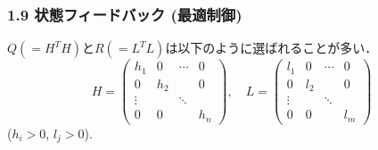 \documentclass[10pt]{beamer}
\begin{document}
\begin{frame}[t]
\frametitle{1.9 状態フィードバック (最適制御)}
$Q(=H^T H)$と$R(=L^T L)$は以下のように選ばれることが多い．
\begin{equation}
 H = \left(\begin{array}{cccc}
            h_1    & 0   & \cdots & 0 \\
      0      & h_2 &        & 0 \\
      \vdots &     & \ddots & \\
      0      & 0   &        & h_n
     \end{array}\right)
 , \quad
 L = \left(\begin{array} {cccc}
            l_1    & 0   & \cdots & 0 \\
      0      & l_2 &        & 0 \\
      \vdots &     & \ddots & \\
      0      & 0   &        & l_m
     \end{array}\right)
\end{equation}
($h_i>0$, $l_j>0$).
\end{frame}
\end{document}
